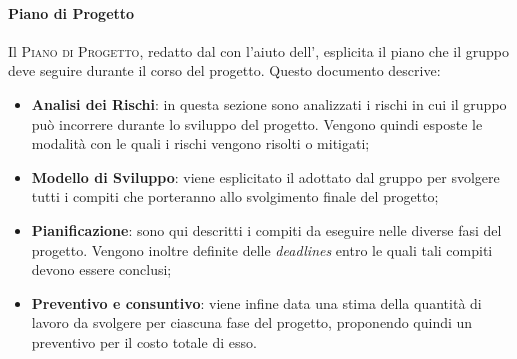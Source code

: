 \documentclass[../norme-di-progetto.tex]{subfiles}
\begin{document}
\paragraph{Piano di Progetto}
Il \textsc{Piano di Progetto}, redatto dal  con l'aiuto dell', esplicita il piano che il gruppo deve seguire durante il corso del progetto. Questo documento descrive:
\begin{itemize}
  \item \textbf{Analisi dei Rischi}: in questa sezione sono analizzati i rischi in cui il gruppo può incorrere durante lo sviluppo del progetto. Vengono quindi esposte le modalità con le quali i rischi vengono risolti o mitigati;
  \item \textbf{Modello di Sviluppo}: viene esplicitato il  adottato dal gruppo per svolgere tutti i compiti che porteranno allo svolgimento finale del progetto;
  \item \textbf{Pianificazione}: sono qui descritti i compiti da eseguire nelle diverse fasi del progetto. Vengono inoltre definite delle \textit{deadlines} entro le quali tali compiti devono essere conclusi;
  \item \textbf{Preventivo e consuntivo}: viene infine data una stima della quantità di lavoro da svolgere per ciascuna fase del progetto, proponendo quindi un preventivo per il costo totale di esso.
\end{itemize}
\end{document}
